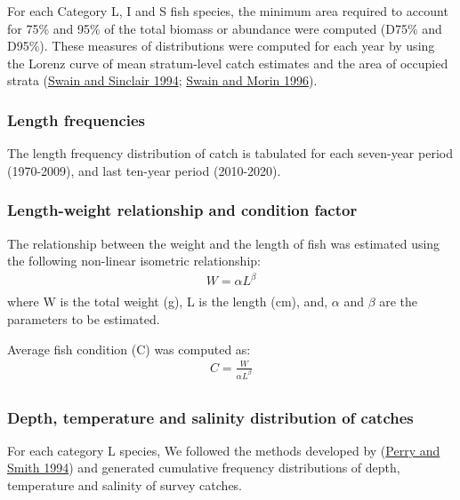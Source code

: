 \documentclass[12pt]{article}\usepackage[]{graphicx}\usepackage[]{color}
\begin{document}
For each Category L, I and S fish species, the minimum area required to account for 75\% and 95\% of the total biomass or abundance were computed (D75\% and D95\%). These measures of distributions were computed for each year by using the Lorenz curve of mean stratum-level catch estimates and the area of occupied strata (\protect\hyperlink{ref-Swain:Sinclair:1994:cjfas}{Swain and Sinclair 1994}; \protect\hyperlink{ref-Swain:Morin:1996:cjfas}{Swain and Morin 1996}).

\hypertarget{length-frequencies}{%
\subsubsection{Length frequencies}\label{length-frequencies}}

The length frequency distribution of catch is tabulated for each seven-year period (1970-2009), and last ten-year period (2010-2020).

\hypertarget{length-weight-relationship-and-condition-factor}{%
\subsubsection{Length-weight relationship and condition factor}\label{length-weight-relationship-and-condition-factor}}

The relationship between the weight and the length of fish was estimated using the following non-linear isometric relationship:
\begin{eqnarray*}\label{eqLengthWeight}
W = \alpha L ^\beta  
\\
\end{eqnarray*}
where W is the total weight (g), L is the length (cm), and, \(\alpha\) and \(\beta\) are the parameters to be estimated.

Average fish condition (C) was computed as:
\begin{eqnarray*}\label{eqCondition}
C = \frac{W}{\alpha L ^\beta}  
\\
\end{eqnarray*}
\hypertarget{depth-temperature-and-salinity-distribution-of-catches}{%
\subsubsection{Depth, temperature and salinity distribution of catches}\label{depth-temperature-and-salinity-distribution-of-catches}}

For each category L species, We followed the methods developed by (\protect\hyperlink{ref-Perry:Smith:1994:cjfas}{Perry and Smith 1994}) and generated cumulative frequency distributions of depth, temperature and salinity of survey catches.
\end{document}
